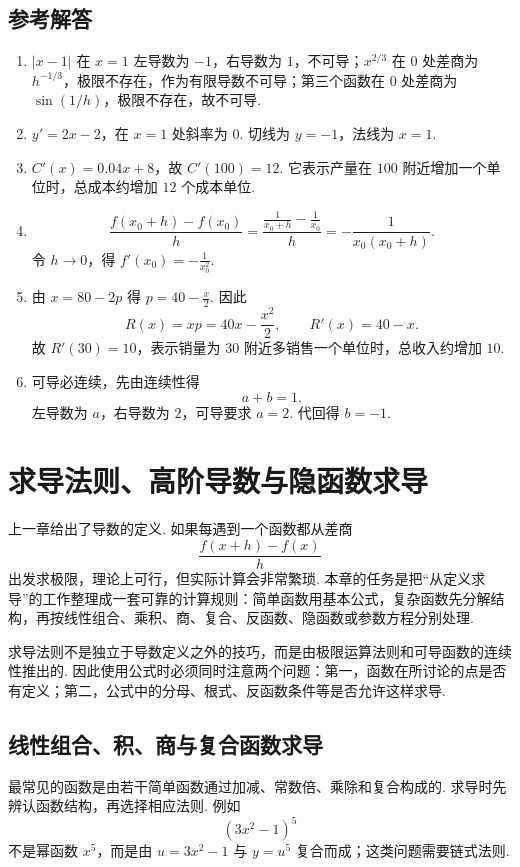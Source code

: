 \documentclass[fontset=fandol]{ctexart}
\newcounter{DefinitionCounter}[section]
\newcounter{TheoremCounter}[section]
\newcounter{PropositionCounter}[section]
\newcounter{ExampleCounter}[section]
\newcounter{ExerciseCounter}[section]
\newcounter{ProblemCounter}[section]
\newcounter{ConclusionCounter}[section]
\newcommand{\renewEnvironmentCounter}{\setcounter{DefinitionCounter}{0}\setcounter{TheoremCounter}{0}\setcounter{PropositionCounter}{0}\setcounter{ExampleCounter}{0}\setcounter{ExerciseCounter}{0}\setcounter{ProblemCounter}{0}\setcounter{ConclusionCounter}{0}}
\begin{document}
\subsection{参考解答}
\begin{enumerate}[label=\textbf{练习\arabic*.},leftmargin=2.2em]
\item $|x-1|$ 在 $x=1$ 左导数为 $-1$，右导数为 $1$，不可导；$x^{2/3}$ 在 $0$ 处差商为 $h^{-1/3}$，极限不存在，作为有限导数不可导；第三个函数在 $0$ 处差商为 $\sin(1/h)$，极限不存在，故不可导.
\item $y'=2x-2$，在 $x=1$ 处斜率为 $0$. 切线为 $y=-1$，法线为 $x=1$.
\item $C'(x)=0.04x+8$，故 $C'(100)=12$. 它表示产量在 $100$ 附近增加一个单位时，总成本约增加 $12$ 个成本单位.
\item
\[
\frac{f(x_0+h)-f(x_0)}{h}
=\frac{\frac1{x_0+h}-\frac1{x_0}}{h}
=-\frac1{x_0(x_0+h)}.
\]
令 $h\to0$，得 $f'(x_0)=-\frac1{x_0^2}$.
\item 由 $x=80-2p$ 得 $p=40-\frac{x}{2}$. 因此
\[
R(x)=xp=40x-\frac{x^2}{2},\qquad R'(x)=40-x.
\]
故 $R'(30)=10$，表示销量为 $30$ 附近多销售一个单位时，总收入约增加 $10$.
\item 可导必连续，先由连续性得
\[
a+b=1.
\]
左导数为 $a$，右导数为 $2$，可导要求 $a=2$. 代回得 $b=-1$.
\end{enumerate}

\section{求导法则、高阶导数与隐函数求导}
\renewEnvironmentCounter

上一章给出了导数的定义. 如果每遇到一个函数都从差商
\[
\frac{f(x+h)-f(x)}{h}
\]
出发求极限，理论上可行，但实际计算会非常繁琐. 本章的任务是把“从定义求导”的工作整理成一套可靠的计算规则：简单函数用基本公式，复杂函数先分解结构，再按线性组合、乘积、商、复合、反函数、隐函数或参数方程分别处理.

求导法则不是独立于导数定义之外的技巧，而是由极限运算法则和可导函数的连续性推出的. 因此使用公式时必须同时注意两个问题：第一，函数在所讨论的点是否有定义；第二，公式中的分母、根式、反函数条件等是否允许这样求导.

\subsection{线性组合、积、商与复合函数求导}

最常见的函数是由若干简单函数通过加减、常数倍、乘除和复合构成的. 求导时先辨认函数结构，再选择相应法则. 例如
\[
(3x^2-1)^5
\]
不是幂函数 $x^5$，而是由 $u=3x^2-1$ 与 $y=u^5$ 复合而成；这类问题需要链式法则.
\end{document}
